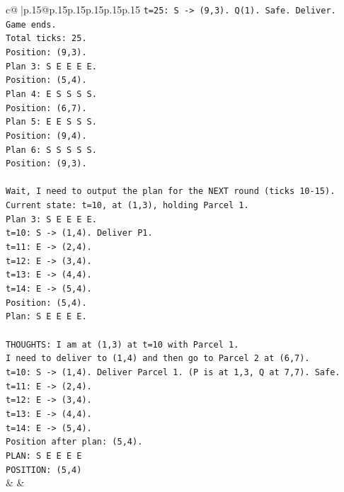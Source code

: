 \documentclass{article}
\begin{document}
{\begin{supertabular}{c@{$\;$}|p{.15\linewidth}@{}p{.15\linewidth}p{.15\linewidth}p{.15\linewidth}p{.15\linewidth}p{.15\linewidth}}
{{{\texttt{t=25: S {-}> (9,3). Q(1). Safe. Deliver.} \\
\texttt{Game ends.} \\
\texttt{Total ticks: 25.} \\
\texttt{Position: (9,3).} \\
\texttt{Plan 3: S E E E E.} \\
\texttt{Position: (5,4).} \\
\texttt{Plan 4: E S S S S.} \\
\texttt{Position: (6,7).} \\
\texttt{Plan 5: E E S S S.} \\
\texttt{Position: (9,4).} \\
\texttt{Plan 6: S S S S S.} \\
\texttt{Position: (9,3).} \\
\\ 
\texttt{Wait, I need to output the plan for the NEXT round (ticks 10{-}15).} \\
\texttt{Current state: t=10, at (1,3), holding Parcel 1.} \\
\texttt{Plan 3: S E E E E.} \\
\texttt{t=10: S {-}> (1,4). Deliver P1.} \\
\texttt{t=11: E {-}> (2,4).} \\
\texttt{t=12: E {-}> (3,4).} \\
\texttt{t=13: E {-}> (4,4).} \\
\texttt{t=14: E {-}> (5,4).} \\
\texttt{Position: (5,4).} \\
\texttt{Plan: S E E E E.} \\
\\ 
\texttt{THOUGHTS: I am at (1,3) at t=10 with Parcel 1.} \\
\texttt{I need to deliver to (1,4) and then go to Parcel 2 at (6,7).} \\
\texttt{t=10: S {-}> (1,4). Deliver Parcel 1. (P is at 1,3, Q at 7,7). Safe.} \\
\texttt{t=11: E {-}> (2,4).} \\
\texttt{t=12: E {-}> (3,4).} \\
\texttt{t=13: E {-}> (4,4).} \\
\texttt{t=14: E {-}> (5,4).} \\
\texttt{Position after plan: (5,4).} \\
\texttt{PLAN: S E E E E} \\
\texttt{POSITION: (5,4)} \\
            }
        }
    }
    & & \\ \\


\end{supertabular}}
\end{document}
